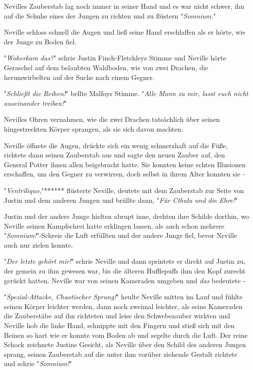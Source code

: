 {Nevilles Zauberstab lag noch immer in seiner Hand und es war nicht schwer, ihn auf die Schuhe eines der Jungen zu richten und zu flüstern "\emph{Somnium.}"

Neville schloss schnell die Augen und ließ seine Hand erschlaffen als er hörte, wie der Junge zu Boden fiel.

"\emph{Woherkam das?}" schrie Justin Finch-Fletchleys Stimme und Neville hörte Geraschel auf dem belaubten Waldboden, wie von zwei Drachen, die herumwirbelten auf der Suche nach einem Gegner.

"\emph{Schließt die Reihen!}" bellte Malfoys Stimme. "\emph{Alle Mann zu mir, lasst euch nicht auseinander treiben!}"

Nevilles Ohren vernahmen, wie die zwei Drachen tatsächlich über seinen hingestreckten Körper sprangen, als sie sich davon machten.

Neville öffnete die Augen, drückte sich ein wenig schmerzhaft auf die Füße, richtete dann seinen Zauberstab aus und sagte den neuen Zauber auf, den General Potter ihnen allen beigebracht hatte. Sie konnten keine echten Illusionen erschaffen, um den Gegner zu verwirren, doch selbst in ihrem Alter konnten sie -

"\emph{Ventriliquo,}"****** flüsterte Neville, deutete mit dem Zauberstab zur Seite von Justin und dem anderen Jungen und brüllte dann, "\emph{Für Cthulu und die Ehre!}"

Justin und der andere Junge hielten abrupt inne, drehten ihre Schilde dorthin, wo Neville seinen Kampfschrei hatte erklingen lassen, als auch schon mehrere "\emph{Somnium!}"-Schreie die Luft erfüllten und der andere Junge fiel, bevor Neville auch nur zielen konnte.

"\emph{Der letzte gehört mir!}" schrie Neville und dann sprintete er direkt auf Justin zu, der gemein zu ihm gewesen war, bis die älteren Hufflepuffs ihm den Kopf zurecht gerückt hatten. Neville war von seinen Kameraden umgeben und \emph{das} bedeutete -

"\emph{Spezial-Attacke, Chaotischer Sprung!}" heulte Neville mitten im Lauf und fühlte seinen Körper leichter werden, dann noch zweimal leichter, als seine Kameraden die Zauberstäbe auf ihn richteten und leise den Schwebezauber wirkten und Neville hob die linke Hand, schnippte mit den Fingern und stieß sich mit den Beinen so hart wie er konnte vom Boden ab und segelte durch die Luft. Der reine Schock zeichnete Justins Gesicht, als Neville über den Schild des anderen Jungen sprang, seinen Zauberstab auf die unter ihm vorüber ziehende Gestalt richtete und schrie "\emph{Somnium!}"

}
